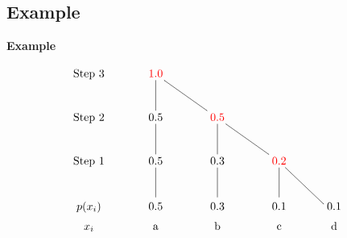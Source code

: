 \documentclass[compress]{beamer}        %
\makeatletter
\newcommand{\tcb}{\textcolor{beamer@blendedblue}}
\newcommand{\tcr}{\textcolor{red}}
\makeatother
\begin{document}
\subsection{Example}
\begin{frame}{\bf \tcb{Example}}

\begin{align*}
    \xymatrix{
     \text{Step 3} & \tcr{1.0} & & & \\
     \text{Step 2} & 0.5 \ar@{-}[u] & \tcr{0.5} \ar@{-}[ul] & & \\
     \text{Step 1} & 0.5 \ar@{-}[u] & 0.3 \ar@{-}[u] & \tcr{0.2} \ar@{-}[ul] & \\
     {\begin{tabular}{c} $p(x_i)$ \\[0.2cm] $x_i$ \end{tabular}} &
     {\begin{tabular}{c} 0.5 \\[0.2cm] a \end{tabular}} \ar@{-}[u] &
     {\begin{tabular}{c} 0.3 \\[0.2cm] b \end{tabular}} \ar@{-}[u] & {\begin{tabular}{c} 0.1 \\[0.2cm] c \end{tabular}} \ar@{-}[u] &
     {\begin{tabular}{@{}c} 0.1 \\[0.2cm] d \end{tabular}} \ar@{-}[ul]}
\end{align*}

\end{frame}
\end{document}
